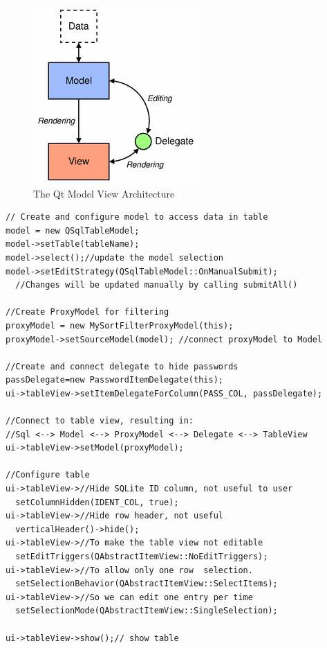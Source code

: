 \begin{figure}[htb]
  \centering
  \captionsetup{justification=centering}
  \centerline{\includegraphics[width=0.5\columnwidth]{chapters/figures/development/modelview.png}}
  \caption{The Qt Model View Architecture}
  \label{fig:modelview}
\end{figure}

\begin{lstlisting}[style=customc, float=htb, caption={Model/View architecture implementation}, label = {lis:modelview}]
// Create and configure model to access data in table
model = new QSqlTableModel;
model->setTable(tableName);
model->select();//update the model selection
model->setEditStrategy(QSqlTableModel::OnManualSubmit);
  //Changes will be updated manually by calling submitAll()

//Create ProxyModel for filtering
proxyModel = new MySortFilterProxyModel(this);
proxyModel->setSourceModel(model); //connect proxyModel to Model

//Create and connect delegate to hide passwords
passDelegate=new PasswordItemDelegate(this);
ui->tableView->setItemDelegateForColumn(PASS_COL, passDelegate);

//Connect to table view, resulting in: 
//Sql <--> Model <--> ProxyModel <--> Delegate <--> TableView
ui->tableView->setModel(proxyModel);

//Configure table
ui->tableView->//Hide SQLite ID column, not useful to user
  setColumnHidden(IDENT_COL, true);
ui->tableView->//Hide row header, not useful
  verticalHeader()->hide();
ui->tableView->//To make the table view not editable
  setEditTriggers(QAbstractItemView::NoEditTriggers);
ui->tableView->//To allow only one row  selection.
  setSelectionBehavior(QAbstractItemView::SelectItems);
ui->tableView->//So we can edit one entry per time
  setSelectionMode(QAbstractItemView::SingleSelection);

ui->tableView->show();// show table
\end{lstlisting}

